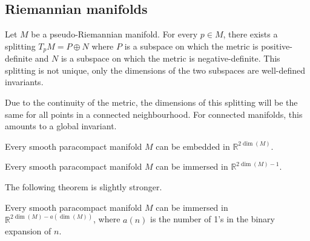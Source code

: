 \subsection{Riemannian manifolds}


    \begin{property}
        Let $M$ be a pseudo-Riemannian manifold. For every $p\in M$, there exists a splitting $T_pM = P\oplus N$ where $P$ is a subspace on which the metric is positive-definite and $N$ is a subspace on which the metric is negative-definite. This splitting is not unique, only the dimensions of the two subspaces are well-defined invariants.
    \end{property}

    Due to the continuity of the metric, the dimensions of this splitting will be the same for all points in a connected neighbourhood. For connected manifolds, this amounts to a global invariant.

    \begin{theorem}
        Every smooth paracompact manifold $M$ can be embedded in $\mathbb{R}^{2\dim(M)}$.
    \end{theorem}
    \begin{theorem}
        Every smooth paracompact manifold $M$ can be immersed in $\mathbb{R}^{2\dim(M)-1}$.
    \end{theorem}

    The following theorem is slightly stronger.
    \begin{theorem}
        Every smooth paracompact manifold $M$ can be immersed in $\mathbb{R}^{2\dim(M)-a(\dim(M))}$, where $a(n)$ is the number of 1's in the binary expansion of $n$.
    \end{theorem}

